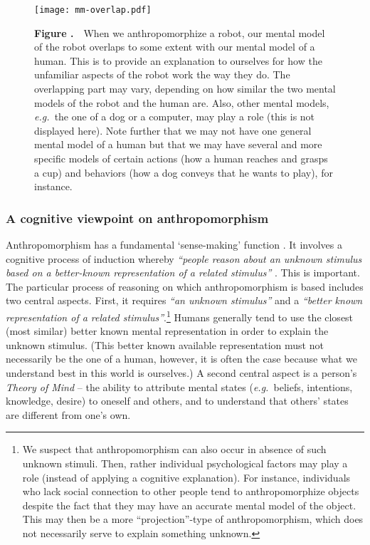 \documentclass{frontiersSCNS} %
\newcommand{\eg}{{\textit{e.g.~}}}
\begin{document}
\begin{figure}
\begin{center}
\texttt{[image: mm-overlap.pdf]}%
\end{center}
 \textbf{\label{fig:mental-model-overlap} Figure .}{~~\small When we anthropomorphize a robot, our mental model of the robot overlaps to some extent with our mental model of a human. This is to provide an explanation to ourselves for how the unfamiliar aspects of the robot work the way they do. The overlapping part may vary, depending on how similar the two mental models of the robot and the human are. Also, other mental models, \eg the one of a dog or a computer, may play a role (this is not displayed here). Note further that we may not have one general mental model of a human but that we may have several and more specific models of certain actions (how a human reaches and grasps a cup) and behaviors (how a dog conveys that he wants to play), for instance.}
\end{figure}

\nocite{admoni_multi-category_2012}

\subsubsection{A cognitive viewpoint on anthropomorphism\\}
\label{sec:cognitive-viewpoint}

Anthropomorphism has a fundamental `sense-making' function \citep{persson_anthropomorphism_2000}. It involves a cognitive process of induction whereby \textit{``people reason about an unknown stimulus based on a better-known representation of a related stimulus''} \citep{epley_when_2008}. This is important. The particular process of reasoning on which anthropomorphism is based includes two central aspects.
First, it requires \textit{``an unknown stimulus''} and a \textit{``better known representation of a related stimulus''}.\footnote{We suspect that anthropomorphism can also occur in absence of such unknown stimuli. Then, rather individual psychological factors may play a role (instead of applying a cognitive explanation). For instance, individuals who lack social connection to other people \citep{epley_creating_2008} tend to anthropomorphize objects despite the fact that they may have an accurate mental model of the object. This may then be a more ``projection''-type of anthropomorphism, which does not necessarily serve to explain something unknown.} Humans generally tend to use the closest (most similar) better known mental representation in order to explain the unknown stimulus. (This better known available representation must not necessarily be the one of a human, however, it is often the case because what we understand best in this world is ourselves.)
A second central aspect is a person's \textit{Theory of Mind} -- the ability to attribute mental states (\eg beliefs, intentions, knowledge, desire) to oneself and others, and to understand that others' states are different from one's own.
\end{document}
